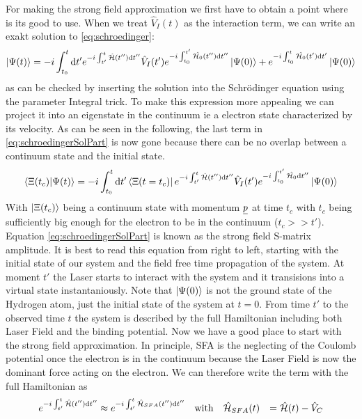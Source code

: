 For making the strong field approximation we first have to obtain a point where is its good to use. 
When we treat $\hat{V}_I(t)$ as the interaction term, we can write an exakt solution to \eqref{eq:schroedinger}:
\begin{equation}
    \ket{\Psi(t)} = -i \int_{t_0}^{t} \mathrm{d} t' e^{-i \int_{t'}^{t} \hat{\mathcal{H}}(t'') \mathrm{d} t''} \hat{V}_I(t') e^{-i \int_{t_0}^{t'} \hat{\mathcal{H}_0}(t'') \mathrm{d} t''} \ket{\Psi(0)} + e^{-i \int_{t_0}^{t} \hat{\mathcal{H}_0}(t') \mathrm{d} t'} \ket{\Psi(0)} \label{eq:schroedingerSolPart}
\end{equation}
as can be checked by inserting the solution into the Schrödinger equation using the parameter Integral trick. 
To make this expression more appealing we can project it into an eigenstate in the continuum ie a electron state characterized by its velocity.
As can be seen in the following, the last term in \eqref{eq:schroedingerSolPart} is now gone because there can be no overlap between a continuum state and the initial state.
\begin{equation}
    \braket{\Xi(t_c)|\Psi(t)} = -i \int_{t_0}^{t} \mathrm{d} t' \bra{\Xi(t=t_c)} e^{-i \int_{t'}^{t} \hat{\mathcal{H}}(t'') \mathrm{d} t''}\hat{V}_I(t') e^{-i \int_{t_0}^{t'} \hat{\mathcal{H}_0} \mathrm{d} t''} \ket{\Psi(0)}
\end{equation}
With $\ket{\Xi(t_c)}$ being a continuum state with momentum $\underline{p}$ at time $t_c$ with $t_c$ being sufficiently big enough for the electron to be in the continuum ($t_c >> t'$). 
Equation \eqref{eq:schroedingerSolPart} is known as the strong field S-matrix amplitude. 
It is best to read this equation from right to left, starting with the initial state of our system and the field free time propagation of the system. 
At moment $t'$ the Laser starts to interact with the system and it transisions into a virtual state instantaniously. 
Note that $\ket{\Psi(0)}$ is not the ground state of the Hydrogen atom, just the initial state of the system at $t=0$.
From time $t'$ to the observed time $t$ the system is described by the full Hamiltonian including both Laser Field and the binding potential.
Now we have a good place to start with the strong field approximation. 
In principle, SFA is the neglecting of the Coulomb potential once the electron is in the continuum because the Laser Field is now the dominant force acting on the electron.
We can therefore write the term with the full Hamiltonian as
\begin{equation*}
    \begin{aligned}
        e^{-i \int_{t'}^{t} \hat{\mathcal{H}}(t'') \mathrm{d} t''} &\approx e^{-i \int_{t'}^{t} \hat{\mathcal{H}}_{SFA}(t'') \mathrm{d} t''} \quad \text{with} \quad \hat{\mathcal{H}}_{SFA}(t) &= \hat{\mathcal{H}}(t) - \hat{V}_C
    \end{aligned}
\end{equation*}
